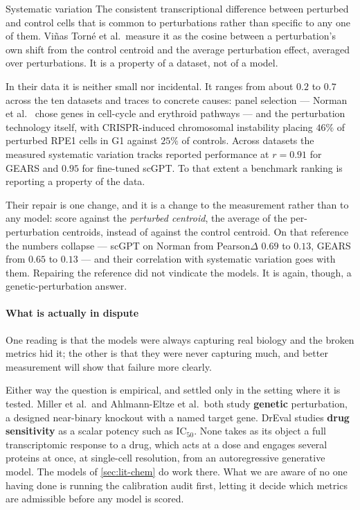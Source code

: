 \begin{defn}{Systematic variation}
The consistent transcriptional difference between perturbed and control cells
that is common to perturbations rather than specific to any one of them. Vi\~nas
Torn\'e et al.\ measure it as the cosine between a perturbation's own shift from
the control centroid and the average perturbation effect, averaged over
perturbations. It is a property of a dataset, not of a model.
\end{defn}

In their data it is neither small nor incidental. It ranges from about $0.2$ to
$0.7$ across the ten datasets and traces to concrete causes: panel selection ---
Norman et al.~\cite{norman} chose genes in cell-cycle and erythroid pathways ---
and the perturbation technology itself, with CRISPR-induced chromosomal
instability placing $46\%$ of perturbed RPE1 cells in G1 against $25\%$ of
controls. Across datasets the measured systematic variation tracks reported
performance at $r = 0.91$ for GEARS and $0.95$ for fine-tuned scGPT. To that
extent a benchmark ranking is reporting a property of the data.

Their repair is one change, and it is a change to the measurement rather than to
any model: score against the \emph{perturbed centroid}, the average of the
per-perturbation centroids, instead of against the control centroid. On that
reference the numbers collapse --- scGPT on Norman from Pearson$\Delta$ $0.69$ to
$0.13$, GEARS from $0.65$ to $0.13$ --- and their correlation with systematic
variation goes with them. Repairing the reference did not vindicate the models.
It is again, though, a genetic-perturbation answer.

\paragraph{What is actually in dispute} One reading is that the models were
always capturing real biology and the broken metrics hid it; the other is that
they were never capturing much, and better measurement will show that failure
more clearly.

Either way the question is empirical, and settled only in the setting where it is
tested. Miller et al.\ and Ahlmann-Eltze et al.\ both study \textbf{genetic}
perturbation, a designed near-binary knockout with a named target gene. DrEval
studies \textbf{drug sensitivity} as a scalar potency such as IC$_{50}$. None
takes as its object a full transcriptomic response to a drug, which acts at a
dose and engages several proteins at once, at single-cell resolution, from an
autoregressive generative model. The models of \cref{sec:lit-chem} do work
there. What we are aware of no one having done is running the calibration audit
first, letting it decide which metrics are admissible before any model is
scored.

